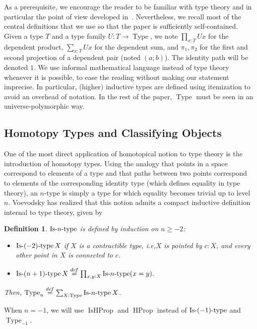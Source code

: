 \documentclass[preprint,9pt,numbers]{sigplanconf}
\newtheorem{defi}[thm]{Definition}
\newcommand \defeq {\overset{de\hspace{-0.2ex}f}{=}}
\newcommand{\mynote}[2]{
    \fbox{\bfseries\sffamily\scriptsize#1}
    {\small$\blacktriangleright$\textsf{\emph{#2}}$\blacktriangleleft$}~}
\newcommand\kq[1]{\mynote{KQ}{#1}}
\newcommand{\ie}{i.e,\xspace}
\DeclareMathOperator{\Type}{Type}
\DeclareMathOperator{\HProp}{HProp}
\DeclareMathOperator{\IsHProp}{IsHProp}
\def\mymathhyphen{{\hbox{-}}}
\newcommand{\IsType}[1]
{\mathop{\mathrm{Is\mymathhyphen}#1\mathrm{\mymathhyphen type}} }
\begin{document}
As a prerequisite, we encourage the reader to be familiar with type theory and
in particular the point of view developed
in~\cite{hottbook}. Nevertheless, we recall most of the central definitions 
that we use so that the paper is sufficiently self-contained.
%
Given a type $T$ and a type family $U : T \to \Type$, we note
$\prod_{x:T} U x$ for the dependent product, $\sum_{x:T} U x$ for the dependent
sum, and $\pi_1, \pi_2$ for the first and second projection of a
dependent pair (noted $(a;b)$). The identity path will be denoted
$1$. We use informal mathematical language
instead of type theory whenever it is possible, to ease the reading
without making our statement imprecise. In particular, (higher)
inductive types are defined using itemization to avoid an overhead of
notation. In the rest of the paper, $\Type$ must be seen in an
universe-polymorphic way.

 
 \subsection{Homotopy Types and Classifying Objects}
\label{ssec:hott}

One of the most direct application of homotopical notion to type
theory is the introduction of homotopy types. 
%
Using the analogy that points in a space correspond to elements of a
type and that paths between two points correspond to 
elements of the corresponding identity type (which defines equality in type theory),  
%
an $n$-type is simply a type
for which equality becomes trivial up to level $n$. 
%
Voevodsky has realized that this notion admits a compact inductive definition
internal to type theory, given by
\begin{defi}
  $\IsType n$ is defined by induction on $n\geqslant -2$:
  \begin{itemize}
  \item $\IsType {(-2)} X$ if $X$ is a contractible type, \ie $X$
    is pointed by $c:X$, and every other point in $X$ is connected to $c$.
  \item $\IsType {(n+1)} X \defeq \prod_{x,y:X} \IsType n (x=y).$
  \end{itemize}
  Then, $\Type_n \defeq \sum_{X:\Type} \IsType n X$.
\end{defi}
%
When $n=-1$, we will use $\IsHProp$ and $\HProp$ instead of
$\IsType{(-1)}$ and $\Type_{-1}$.
\end{document}
